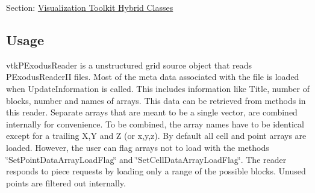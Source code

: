 Section\-: \hyperlink{sec_vtkhybrid}{Visualization Toolkit Hybrid Classes} \hypertarget{vtkwidgets_vtkxyplotwidget_Usage}{}\subsection{Usage}\label{vtkwidgets_vtkxyplotwidget_Usage}
vtk\-P\-Exodus\-Reader is a unstructured grid source object that reads P\-Exodus\-Reader\-I\-I files. Most of the meta data associated with the file is loaded when Update\-Information is called. This includes information like Title, number of blocks, number and names of arrays. This data can be retrieved from methods in this reader. Separate arrays that are meant to be a single vector, are combined internally for convenience. To be combined, the array names have to be identical except for a trailing X,Y and Z (or x,y,z). By default all cell and point arrays are loaded. However, the user can flag arrays not to load with the methods \char`\"{}\-Set\-Point\-Data\-Array\-Load\-Flag\char`\"{} and \char`\"{}\-Set\-Cell\-Data\-Array\-Load\-Flag\char`\"{}. The reader responds to piece requests by loading only a range of the possible blocks. Unused points are filtered out internally.

